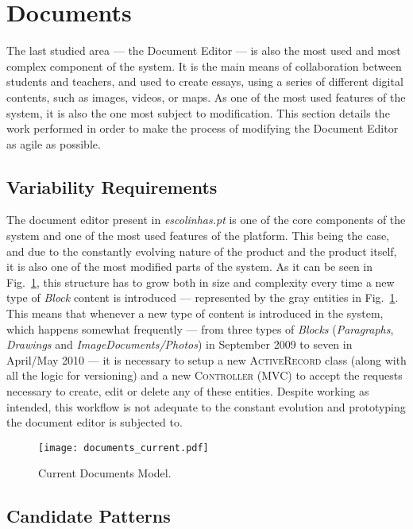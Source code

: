 \section{Documents}\label{sec:fa_documents}

The last studied area --- the Document Editor --- is also the most used and most complex component of the system. It is the main means of collaboration between students and teachers, and used to create essays, using a series of different digital contents, such as images, videos, or maps. As one of the most used features of the system, it is also the one most subject to modification. This section details the work performed in order to make the process of modifying the Document Editor as agile as possible.

\subsection{Variability Requirements}\label{sec:fa_documents_variability_requirements}

The document editor present in \emph{escolinhas.pt} is one of the core components of the system and one of the most used features of the platform. This being the case, and due to the constantly evolving nature of the product and the product itself, it is also one of the most modified parts of the system. As it can be seen in Fig.~\ref{fig:documents_current}, this structure has to grow both in size and complexity every time a new type of \emph{Block} content is introduced --- represented by the gray entities in Fig.~\ref{fig:documents_current}. This means that whenever a new type of content is introduced in the system, which happens somewhat frequently --- from three types of \emph{Blocks} (\emph{Paragraphs}, \emph{Drawings} and \emph{ImageDocuments/Photos}) in September 2009 to seven in April/May 2010 --- it is necessary to setup a new \textsc{ActiveRecord} class (along with all the logic for versioning) and a new \textsc{Controller} (MVC) to accept the requests necessary to create, edit or delete any of these entities. Despite working as intended, this workflow is not adequate to the constant evolution and prototyping the document editor is subjected to.

\begin{figure}[H]
  \centering
  \texttt{[image: documents\_current.pdf]}
  \caption{Current Documents Model.}
  \label{fig:documents_current}
\end{figure}

\subsection{Candidate Patterns}\label{sec:fa_documents_candidate_patterns}

